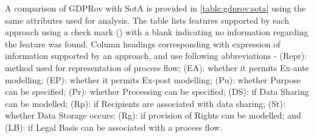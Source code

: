 A comparison of GDPRov with SotA is provided in \autoref{table:gdprov:sota} using the same attributes used for analysis.
The table lists features supported by each approach using a check mark (\cmark) with a blank indicating no information regarding the feature was found.
Column headings corresponding with expression of information supported by an approach, and use following abbreviations - (Repr): method used for representation of process flow; (EA): whether it permits Ex-ante modelling; (EP): whether it permits Ex-post modelling; (Pu): whether Purpose can be specified; (Pr): whether Processing can be specified; (DS): if Data Sharing can be modelled; (Rp): if Recipients are associated with data sharing; (St): whether Data Storage occurs; (Rg): if provision of Rights can be modelled; and (LB): if Legal Basis can be associated with a process flow.

